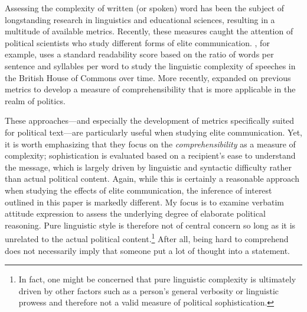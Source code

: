 Assessing the complexity of written (or spoken) word has been the subject of longstanding research in linguistics and educational sciences, resulting in a multitude of available metrics. Recently, these measures caught the attention of political scientists who study different forms of elite communication. \citet{spirling2016democratization}, for example, uses a standard readability score based on the ratio of words per sentence and syllables per word to study the linguistic complexity of speeches in the British House of Commons over time. More recently, \citet{benoit2017measuring} expanded on previous metrics to develop a measure of comprehensibility that is more applicable in the realm of politics.

These approaches---and especially the development of metrics specifically suited for political text---are particularly useful when studying elite communication. Yet, it is worth emphasizing that they focus on the \textit{comprehensibility} as a measure of complexity; sophistication is evaluated based on a recipient's ease to understand the message, which is largely driven by linguistic and syntactic difficulty rather than actual political content. Again, while this is certainly a reasonable approach when studying the effects of elite communication, the inference of interest outlined in this paper is markedly different. My focus is to examine verbatim attitude expression to assess the underlying degree of elaborate political reasoning. Pure linguistic style is therefore not of central concern so long as it is unrelated to the actual political content.\footnote{In fact, one might be concerned that pure linguistic complexity is ultimately driven by other factors such as a person's general verbosity or linguistic prowess and therefore not a valid measure of political sophistication.} After all, being hard to comprehend does not necessarily imply that someone put a lot of thought into a statement.

